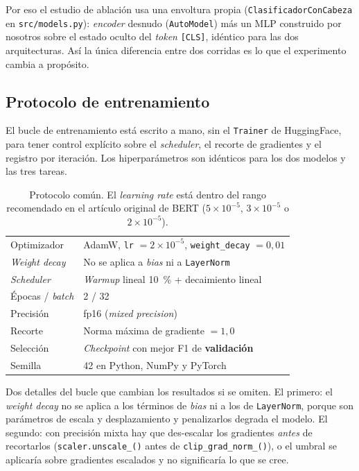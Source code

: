 Por eso el estudio de ablación usa una envoltura propia
(\texttt{ClasificadorConCabeza} en \texttt{src/models.py}): \textit{encoder}
desnudo (\texttt{AutoModel}) más un MLP construido por nosotros sobre el
estado oculto del \textit{token} \texttt{[CLS]}, idéntico para las dos
arquitecturas. Así la única diferencia entre dos corridas es lo que el
experimento cambia a propósito.

\subsection{Protocolo de entrenamiento}

El bucle de entrenamiento está escrito a mano, sin el \texttt{Trainer} de
HuggingFace, para tener control explícito sobre el \textit{scheduler}, el
recorte de gradientes y el registro por iteración. Los hiperparámetros son
idénticos para los dos modelos y las tres tareas.

\begin{table}[h]
\centering
\small
\begin{tabular}{ll}
\toprule
Optimizador        & AdamW, \texttt{lr} $= 2\times10^{-5}$, \texttt{weight\_decay} $= 0{,}01$ \\
\textit{Weight decay} & No se aplica a \textit{bias} ni a \texttt{LayerNorm} \\
\textit{Scheduler} & \textit{Warmup} lineal \SI{10}{\percent} + decaimiento lineal \\
Épocas / \textit{batch} & 2 / 32 \\
Precisión          & fp16 (\textit{mixed precision}) \\
Recorte            & Norma máxima de gradiente $= 1{,}0$ \\
Selección          & \textit{Checkpoint} con mejor F1 de \textbf{validación} \\
Semilla            & 42 en Python, NumPy y PyTorch \\
\bottomrule
\end{tabular}
\caption{Protocolo común. El \textit{learning rate} está dentro del rango
recomendado en el artículo original de BERT ($5\times10^{-5}$,
$3\times10^{-5}$ o $2\times10^{-5}$).}
\end{table}

Dos detalles del bucle que cambian los resultados si se omiten. El primero:
el \textit{weight decay} no se aplica a los términos de \textit{bias} ni a los
de \texttt{LayerNorm}, porque son parámetros de escala y desplazamiento y
penalizarlos degrada el modelo. El segundo: con precisión mixta hay que
des-escalar los gradientes \emph{antes} de recortarlos
(\texttt{scaler.unscale\_()} antes de \texttt{clip\_grad\_norm\_()}), o el
umbral se aplicaría sobre gradientes escalados y no significaría lo que se
cree.

